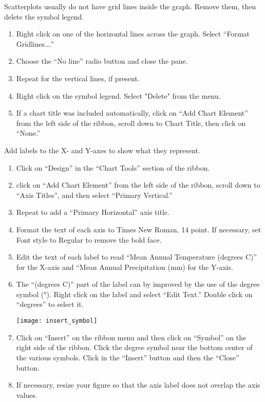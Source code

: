\documentclass[11pt]{article}
\begin{document}
Scatterplots usually do not have grid lines inside the graph. Remove them, then delete the symbol legend.

\begin{enumerate}[resume]
	\item Right click on one of the horizontal lines across the graph. Select “Format Gridlines….”

	\item Choose the “No line” radio button and close the pane. 

	\item Repeat for the vertical lines, if present.
	
	\item Right click on the symbol legend. Select "Delete" from the menu.
	
	\item If a chart title was included automatically, click on “Add Chart Element” from the left side of the ribbon, scroll down to Chart Title, then click on “None.” 
\end{enumerate}

Add labels to the X- and Y-axes to show what they represent.

\begin{enumerate}[resume]
	\item Click on “Design” in the “Chart Tools” section of the ribbon.

	\item click on “Add Chart Element” from the left side of the ribbon, scroll down to “Axis Titles”, and then select “Primary Vertical.”

	\item Repeat to add a “Primary Horizontal” axis title.

	\item Format the text of each axis to Times New Roman, 14 point. If necessary, set Font style to Regular to remove the bold face.

	\item Edit the text of each label to read “Mean Annual Temperature (degrees C)” for the X-axis and “Mean Annual Precipitation (mm) for the Y-axis.

	\item The “(degrees C)” part of the label can by improved by the use of the degree symbol (°). Right click on the label and select “Edit Text.” Double click on “degrees” to select it.

\begin{center}
	\texttt{[image: insert\_symbol]}
\end{center}

	\item Click on “Insert” on the ribbon menu and then click on “Symbol” on the right side of the ribbon. Click the degree symbol near the bottom center of the various symbols. Click in the “Insert” button and then the “Close” button. 
	
	\item If necessary, resize your figure so that the axis label does not overlap the axis values.
\end{enumerate}
 
\end{document}
